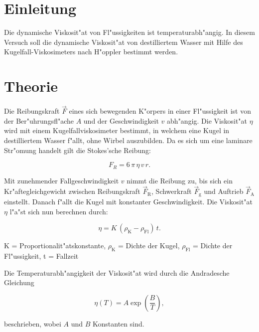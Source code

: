 \section{Einleitung}
	\label{sec:einleitung}

	Die dynamische Viskosit"at von Fl"ussigkeiten ist temperaturabh"angig. In diesem Versuch soll die dynamische Viskosit"at von destilliertem Wasser mit Hilfe des Kugelfall-Vis\-ko\-si\-me\-ters nach H"oppler bestimmt werden.

\section{Theorie}
	\label{sec:theorie}

	Die Reibungskraft $\vec{F}$ eines sich bewegenden K"orpers in einer Fl"ussigkeit ist von der Ber"uhrungsfl"ache $A$ und der Geschwindigkeit $v$ abh"angig.
	Die Viskosit"at $\eta$ wird mit einem Kugelfallviskosimeter bestimmt, in welchem eine Kugel in destilliertem Wasser f"allt, ohne Wirbel auszubilden.
	Da es sich um eine laminare Str"omung handelt gilt die Stokes'sche Reibung:

	\begin{equation}
		F_R = 6\, \pi\, \eta\, v\, r.
	\end{equation}

	Mit zunehmender Fallgeschwindigkeit $v$ nimmt die Reibung zu, bis sich ein Kr"af\-te\-gleich\-ge\-wicht zwischen Reibungskraft $\vec{F}_\mathrm{R}$, Schwerkraft $\vec{F}_\mathrm{g}$ und Auftrieb $\vec{F}_\mathrm{A}$ einstellt.
	Danach f"allt die Kugel mit konstanter Geschwindigkeit.
	Die Viskosit"at $\eta$ l"a"st sich nun berechnen durch:

	\begin{equation}
		\eta = K\,(\rho_\mathrm{K} - \rho_{\mathrm{Fl}})\,t. \label{viskositaet_0}
	\end{equation}

	\begin{center}
			\tiny{K = Proportionalit"atskonstante, $\rho_\mathrm{K}$ = Dichte der Kugel, $\rho_{\mathrm{Fl}}$ = Dichte der Fl"ussigkeit, t = Fallzeit}
	\end{center}

	Die Temperaturabh"angigkeit der Viskosit"at wird durch die Andradesche Gleichung

	\begin{equation}
		\eta(T) = A \exp(\frac{B}{T}), \label{viskositaet_dyn}
	\end{equation}

	beschrieben, wobei $A$ und $B$ Konstanten sind.